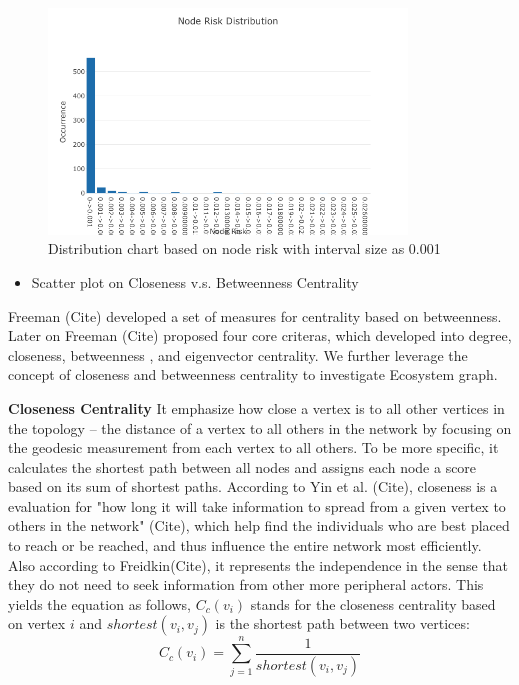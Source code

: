 \documentclass[letterpaper, 10 pt, conference]{ieeeconf}  %
\begin{document}
\begin{figure}[h!]
  \includegraphics[width=\linewidth, height=6cm]{node_risk_distribution.png}
  \caption{Distribution chart based on node risk with interval size as 0.001}
  \label{fig:node_risk_distribution}
\end{figure}

\begin{itemize}
\item Scatter plot on Closeness v.s. Betweenness Centrality
\end{itemize}

Freeman (Cite) developed a set of measures for centrality based on betweenness. Later on Freeman (Cite) proposed four core criteras, which developed into degree, closeness, betweenness , and eigenvector centrality. We further leverage the concept of closeness and betweenness centrality to investigate Ecosystem graph.

\textbf{Closeness Centrality}
 It emphasize how close a vertex is to all other vertices in the topology -- the distance of a vertex to all others in the network by focusing on the geodesic measurement from each vertex to all others. To be more specific, it calculates the shortest path between all nodes and assigns each node a score based on its sum of shortest paths. According to Yin et al. (Cite), closeness is a evaluation for "how long it will take information to spread from a given vertex to others in the network" (Cite), which help find the individuals who are best placed to reach or be reached, and thus influence the entire network most efficiently. Also according to Freidkin(Cite), it represents the independence in the sense that they do not need to seek information from other more peripheral actors.
This yields the equation as follows, $C_{c}(v_{i})$ stands for the closeness centrality based on vertex $i$ and $shortest(v_{i},v_{j})$ is the shortest path between two vertices:
\begin{equation}
C_{c}(v_{i}) = \sum_{j = 1}^{n} \frac{1}{shortest(v_{i}, v_{j})}
\label{C}
\end{equation}
\end{document}

